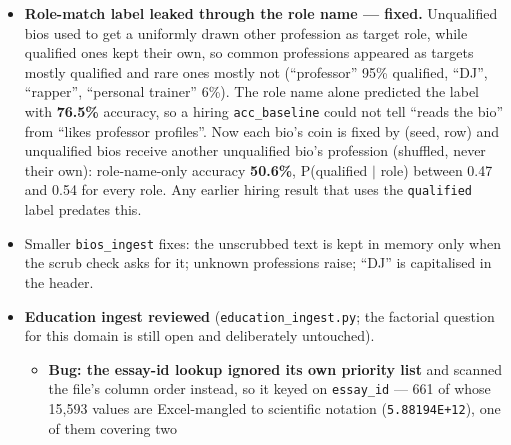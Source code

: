\documentclass{article}
\begin{document}
\begin{itemize}
\begin{itemize}
                drop (\emph{actress}, \emph{chairman}, \emph{brother}, \dots).
          \item \textbf{Result:} 94{,}226 of 257{,}478 bios kept (dropped: 98{,}332 length, 11{,}382 gendered
                words, 53{,}538 first names, mixed-case names included); the old ``no name found'' drop is gone. Women are 46.1\% of the
                corpus but 42.9\% of kept bios --- a small selection effect to report. ``women''/``men'' are
                kept and reported: 3.9\% of kept bios mention them.
          \item Every hiring number must be re-run on the new data anyway, and the scrub check
                (\texttt{validate\_bios\_scrub.py}) must be re-run before any sex-axis result is trusted.
        \end{itemize}
  \item \textbf{Role-match label leaked through the role name --- fixed.} Unqualified bios used to get a
        uniformly drawn other profession as target role, while qualified ones kept their own, so common
        professions appeared as targets mostly qualified and rare ones mostly not (``professor'' 95\%
        qualified, ``DJ'', ``rapper'', ``personal trainer'' 6\%). The role name alone predicted the label
        with \textbf{76.5\%} accuracy, so a hiring \texttt{acc\_baseline} could not tell ``reads the
        bio'' from ``likes professor profiles''. Now each bio's coin is fixed by (seed, row) and unqualified
        bios receive another unqualified bio's profession (shuffled, never their own): role-name-only
        accuracy \textbf{50.6\%}, P(qualified $\mid$ role) between 0.47 and 0.54 for every role. Any earlier
        hiring result that uses the \texttt{qualified} label predates this.
  \item Smaller \texttt{bios\_ingest} fixes: the unscrubbed text is kept in memory only when the scrub
        check asks for it; unknown professions raise; ``DJ'' is capitalised in the header.
  \item \textbf{Education ingest reviewed} (\texttt{education\_ingest.py}; the factorial question for this
        domain is still open and deliberately untouched).
        \begin{itemize}
          \item \textbf{Bug: the essay-id lookup ignored its own priority list} and scanned the file's
                column order instead, so it keyed on \texttt{essay\_id} --- 661 of whose 15{,}593 values
                are Excel-mangled to scientific notation (\texttt{5.88194E+12}), one of them covering two

\end{itemize}
\end{itemize}
\end{document}
